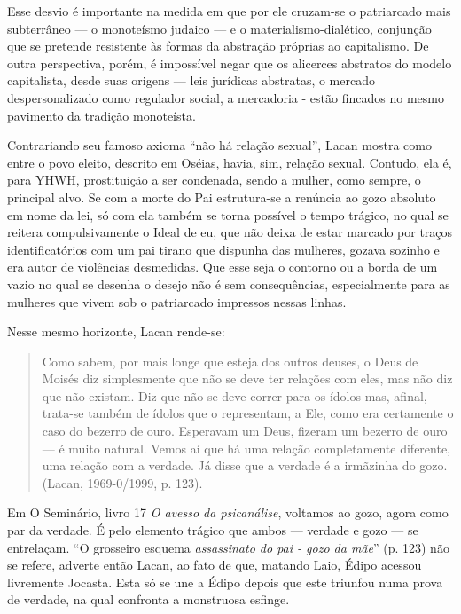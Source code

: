 Esse desvio é importante na medida em que por ele cruzam-se o
patriarcado mais subterrâneo --- o monoteísmo judaico --- e o
materialismo-dialético, conjunção que se pretende resistente às formas
da abstração próprias ao capitalismo. De outra perspectiva, porém, é
impossível negar que os alicerces abstratos do modelo capitalista, desde
suas origens --- leis jurídicas abstratas, o mercado despersonalizado
como regulador social, a mercadoria - estão fincados no mesmo pavimento
da tradição monoteísta.

Contrariando seu famoso axioma ``não há relação sexual'', Lacan mostra
como entre o povo eleito, descrito em Oséias, havia, sim, relação
sexual. Contudo, ela é, para YHWH, prostituição a ser condenada, sendo a
mulher, como sempre, o principal alvo. Se com a morte do Pai
estrutura-se a renúncia ao gozo absoluto em nome da lei, só com ela
também se torna possível o tempo trágico, no qual se reitera
compulsivamente o Ideal de eu, que não deixa de estar marcado por traços
identificatórios com um pai tirano que dispunha das mulheres, gozava
sozinho e era autor de violências desmedidas. Que esse seja o contorno
ou a borda de um vazio no qual se desenha o desejo não é sem
consequências, especialmente para as mulheres que vivem sob o
patriarcado impressos nessas linhas.

Nesse mesmo horizonte, Lacan rende-se:

\begin{quote}
Como sabem, por mais longe que esteja dos outros deuses, o Deus de
Moisés diz simplesmente que não se deve ter relações com eles, mas não
diz que não existam. Diz que não se deve correr para os ídolos mas,
afinal, trata-se também de ídolos que o representam, a Ele, como era
certamente o caso do bezerro de ouro. Esperavam um Deus, fizeram um
bezerro de ouro --- é muito natural. Vemos aí que há uma relação
completamente diferente, uma relação com a verdade. Já disse que a
verdade é a irmãzinha do gozo. (Lacan, 1969-0/1999, p. 123).
\end{quote}

Em O Seminário, livro 17 \emph{O avesso da psicanálise}, voltamos ao
gozo, agora como par da verdade. É pelo elemento trágico que ambos ---
verdade e gozo --- se entrelaçam. ``O grosseiro esquema \emph{assassinato
do pai - gozo da mãe}'' (p. 123) não se refere, adverte então Lacan, ao
fato de que, matando Laio, Édipo acessou livremente Jocasta. Esta só se
une a Édipo depois que este triunfou numa prova de verdade, na qual
confronta a monstruosa esfinge.

